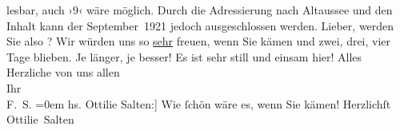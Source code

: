 \begin{ledgroupsized}[t]{13cm}
{{{                     lesbar, auch ›9‹ wäre möglich. Durch die Adressierung nach Altaussee und den Inhalt kann der September 1921 jedoch ausgeschlossen werden.}}}\label{K_L03574-1h}\pend
           \pstart{}Lieber,\pend\pstart
           werden Sie also \label{K_L03574-2v}\label{K_L03574-2h}? Wir würden uns so \uline{sehr} freuen, wenn
               Sie kämen und zwei, drei, vier Tage blieben. Je länger, je besser! Es ist sehr still
               und einsam hier!\pend
           \pstart
           Alles Herzliche von uns allen {\\[\baselineskip]}Ihr {\\[\baselineskip]}\spacefill\mbox{F. S.}\pend
           \leftskip=0em{}\pstart
           \noindent{}{[}hs. Ottilie Salten:{]} Wie ſchön wäre es, wenn Sie kämen! Herzlichſt
                  \spacefill\mbox{Ottilie Salten}\pend
           
         
         \endnumbering{}\end{ledgroupsized}  \newcommand{\dateiname}{L03574}\newcommand{\titel}{Felix und Ottilie Salten an Arthur Schnitzler, 17. [8.?] 1921}\newcommand{\editorInnen}{Martin Anton Müller und Laura Untner}
      
